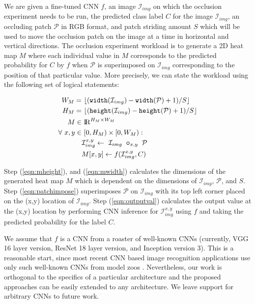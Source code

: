 We are given a fine-tuned CNN $f$, an image $\mathcal{I}_{img}$ on which the occlusion experiment needs to be run, the predicted class label $C$ for the image $\mathcal{I}_{img}$, an occluding patch $\mathcal{P}$ in RGB format, and patch striding amount $S$ which will be used to move the occlusion patch on the image at a time in horizontal and vertical directions. The occlusion experiment workload is to generate a 2D heat map $M$ where each individual value in $M$ corresponds to the predicted probability for $C$ by $f$ when $\mathcal{P}$ is superimposed on $\mathcal{I}_{img}$ corresponding to the position of that particular value. More precisely, we can state the workload using the following set of logical statements:


\begin{align}
\label{eqn:mheight}
W_M =&~ \lfloor(\texttt{width}(\mathcal{I}_{img}) - \texttt{width}(\mathcal{P}) + 1)/S\rfloor\\
\label{eqn:mwidth}
H_M =&~ \lfloor(\texttt{height}(\mathcal{I}_{img}) - \texttt{height}(\mathcal{P}) + 1)/S\rfloor\\
M \in&~ \mathcal{\rm I\!R}^{H_M \times W_M}\\
\forall~ x,y \in&~ [0, H_M) \times [0, W_M):\\
\label{eqn:patchimpose}
& \mathcal{I}_{img}^{x,y} \leftarrow ~\mathcal{I}_{img} ~ \bm\circ_{x,y} ~ \mathcal{P} \\
\label{eqn:outputval}
& M[x,y] \leftarrow f(\mathcal{I}_{img}^{x,y},C)
\end{align}

Step (\ref{eqn:mheight}), and (\ref{eqn:mwidth}) calculates the dimensions of the generated heat map $M$ which is dependent on the dimensions of $\mathcal{I}_{img}$, $\mathcal{P}$, and $S$.
Step (\ref{eqn:patchimpose}) superimposes $\mathcal{P}$ on $\mathcal{I}_{img}$ with its top left corner placed on the (x,y) location of $\mathcal{I}_{img}$.
Step (\ref{eqn:outputval}) calculates the output value at the (x,y) location by performing CNN inference for $\mathcal{I}_{img}^{x,y}$ using $f$ and taking the predicted probability for the label $C$.

We assume that $f$ is a CNN from a roaster of well-known CNNs (currently, VGG 16 layer version, ResNet 18 layer version, and Inception version 3).
This is a reasonable start, since most recent CNN based image recognition applications use only such well-known CNNs from model zoos \cite{caffemodelzoo, tfmodelzoo}.
Nevertheless, our work is orthogonal to the specifics of a particular architecture and the proposed approaches can be easily extended to any architecture.
We leave support for arbitrary CNNs to future work.

